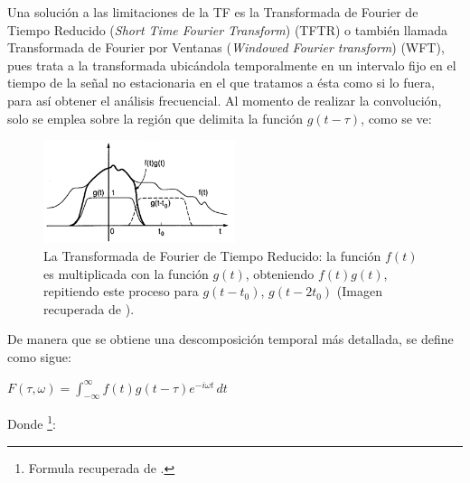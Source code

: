 Una solución a las limitaciones de la TF es  %
la Transformada de Fourier de Tiempo Reducido (\textit{Short Time Fourier Transform}) (TFTR) o también llamada Transformada de Fourier por Ventanas (\textit{Windowed Fourier transform}) (WFT), pues trata a la transformada ubicándola temporalmente en un intervalo fijo en el tiempo de la señal no estacionaria en el que tratamos a ésta como si lo fuera, para así obtener el análisis frecuencial. Al momento de realizar la convolución, solo  se emplea sobre la región que delimita la función $g(t-\tau)$, como se ve:

\begin{figure}[h]
    \centering
    \includegraphics[width=0.5\textwidth]{Figuras/descomposicion/windowed_fourier_transform.png}
    \caption{La Transformada de Fourier de Tiempo Reducido: la función $f(t)$ es multiplicada con la función $g(t)$, obteniendo $f(t)g(t)$, repitiendo este proceso para $g(t-t_0)$, $g(t-2t_0)$ (Imagen recuperada de \cite{ten_lec_wavelets_Daubechies_1}).} 
    \label{fig:WFT}
\end{figure}

\newpage

De manera que se obtiene una descomposición temporal más detallada, se define como sigue:\\

\begin{center}

$
F(\tau, \omega) = \int_{-\infty}^{\infty} f(t) g(t - \tau) e^{-i\omega t} \, dt
$
    
\end{center}


Donde \footnote{Formula recuperada de \cite{STFT}.}:

